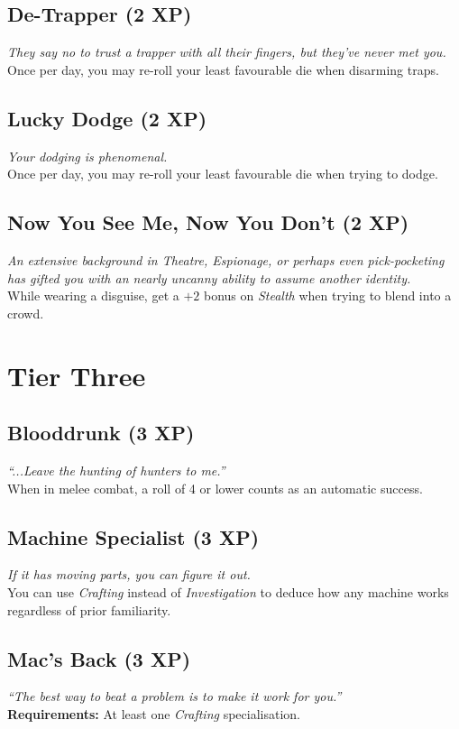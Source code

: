 \subsection{De-Trapper (2 XP)}
\textit{They say no to trust a trapper with all their fingers, but they've never met you.}\\
Once per day, you may re-roll your least favourable die when disarming traps.

\subsection{Lucky Dodge (2 XP)}
\textit{Your dodging is phenomenal.}\\
Once per day, you may re-roll your least favourable die when trying to dodge.

\subsection{Now You See Me, Now You Don't (2 XP)}
\textit{An extensive background in Theatre, Espionage, or perhaps even pick-pocketing has gifted you with an nearly uncanny ability to assume another identity.}\\
While wearing a disguise, get a $+2$ bonus on \textit{Stealth} when trying to blend into a crowd.

\section{Tier Three}

\subsection{Blooddrunk (3 XP)}
\textit{``...Leave the hunting of hunters to me.''}\\
When in melee combat, a roll of 4 or lower counts as an automatic success.

\subsection{Machine Specialist (3 XP)}
\textit{If it has moving parts, you can figure it out.}\\
You can use \textit{Crafting} instead of \textit{Investigation} to deduce how any machine works regardless of prior familiarity.

\subsection{Mac's Back (3 XP)}
\textit{``The best way to beat a problem is to make it work for you.''}\\
\textbf{Requirements:} At least one \textit{Crafting} specialisation.

